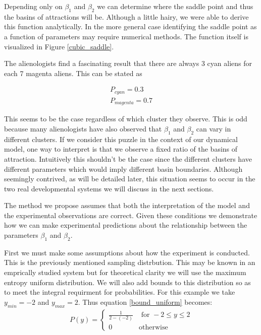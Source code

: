 \documentclass[letterpaper]{article}
\begin{document}
Depending only on $\beta_1$ and $\beta_2$ we
can determine where the saddle point and thus the basins of attractions will be.
Although a little hairy, we were able to derive this function analytically. In 
the more general case identifying the saddle point as a function of parameters 
may require numerical methods. The function itself is visualized in
Figure \ref{cubic_saddle}. 

The alienologists find a fascinating result that there
are always 3 cyan aliens for each 7 magenta aliens. This can be stated as 

\begin{eqnarray}
  P_{cyan} = 0.3\\
  P_{magenta} = 0.7
\end{eqnarray}

This seems to be the case regardless
of which cluster they observe. This is odd because many alienologists have
also observed that $\beta_1$ and $\beta_2$ can vary in different clusters. 
If we consider this puzzle in the context of our dynamical
model, one way to interpret is that we observe a fixed ratio of the basins of
attraction. Intuitively this shouldn't be the case since the different
clusters have different parameters which would imply different basin boundaries.
Although seemingly contrived, as will be detailed later, 
this situation seems to occur in the two
real developmental systems we will discuss in the next sections.

The method we propose assumes that both the interpretation of the model and the
experimental observations are correct. Given these conditions we demonstrate 
how we can make experimental predictions about the relationship between the 
parameters $\beta_1$ and $\beta_2$.

First we must make some assumptions
about how the experiment is conducted. This is the previously mentioned 
sampling distrbution.
This may be known in an emprically studied system but for theoretical 
clarity we will use the maximum entropy uniform distribution. We will also add
bounds to this distribution so as to meet the integral requirment for 
probabilities. For this example we take $y_{min} = -2$ and $y_{max} = 2$.
Thus equation \ref{bound_uniform} becomes:
\begin{eqnarray}
  \label{p_cubic}
    P(y) = \begin{cases}
        \frac{1}{2 - (-2)} & \text{ for } -2\leq y\leq 2\\
        0 & \text{otherwise}
    \end{cases}
\end{eqnarray}
\end{document}

